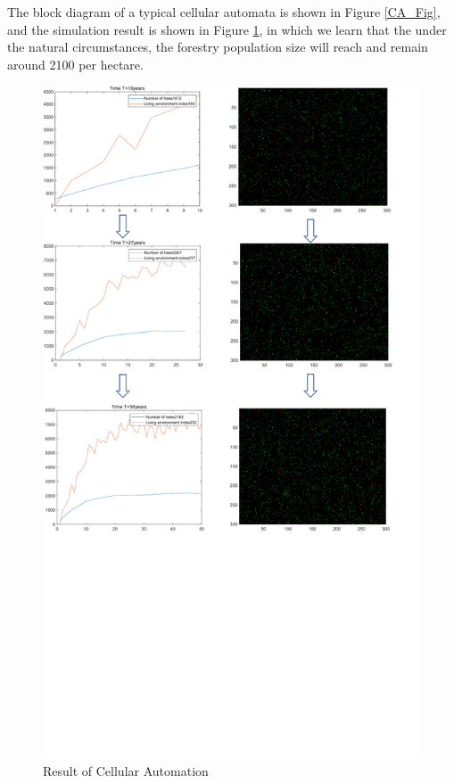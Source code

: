 \documentclass{mcmthesis}
\numberwithin{figure}{section}
\numberwithin{table}{section}
\numberwithin{equation}{section}
\begin{document}
The block diagram of a typical cellular automata is shown in Figure \ref{CA_Fig}, 
and the simulation result is shown in Figure \ref{CA_Result}, in which
we learn that the under the natural circumstances, the forestry population size
will reach and remain around 2100 per hectare. 

\begin{figure}[t]
  \centering
  \includegraphics[width = 14cm]{code&pic/CA-pic.pdf}
  \caption{Result of Cellular Automation}\label{CA_Result}
\end{figure}
\end{document}
